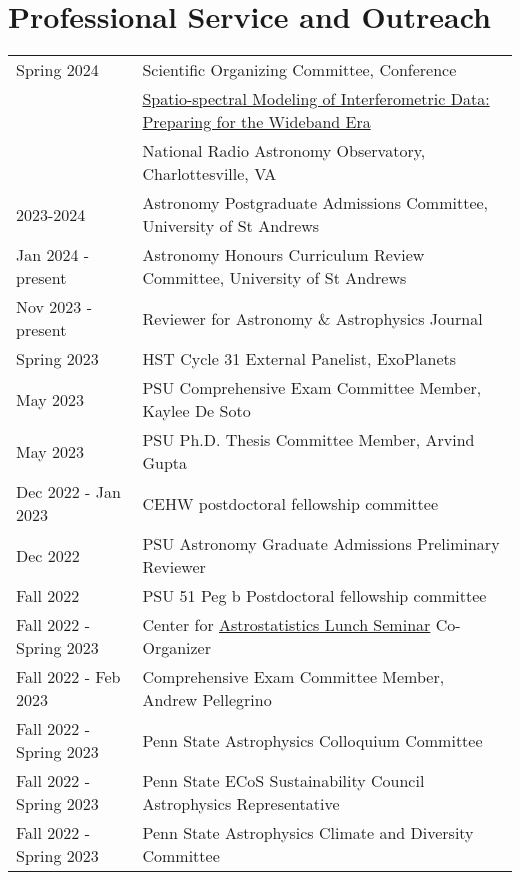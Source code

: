 \section*{Professional Service and Outreach}
\begin{tabular*}{\textwidth}{@{\hspace{10pt}}p{1.4in}l}
Spring 2024 & Scientific Organizing Committee, Conference\\
& \href{https://science.nrao.edu/facilities/alma/naasc-workshops/ssmid/index}{Spatio-spectral Modeling of Interferometric Data: Preparing for the Wideband Era} \\
& National Radio Astronomy Observatory, Charlottesville, VA \\
2023-2024 & Astronomy Postgraduate Admissions Committee, University of St Andrews \\
Jan 2024 - present & Astronomy Honours Curriculum Review Committee, University of St Andrews \\
Nov 2023 - present & Reviewer for Astronomy \& Astrophysics Journal \\
Spring 2023 & HST Cycle 31 External Panelist, ExoPlanets \\
May 2023 & PSU Comprehensive Exam Committee Member, Kaylee De Soto \\    
May 2023 & PSU Ph.D. Thesis Committee Member, Arvind Gupta\\
Dec 2022 - Jan 2023 & CEHW postdoctoral fellowship committee \\
Dec 2022 & PSU Astronomy Graduate Admissions Preliminary Reviewer \\
Fall 2022 & PSU 51 Peg b Postdoctoral fellowship committee \\
Fall 2022 - Spring 2023 & Center for \href{https://sites.psu.edu/astrostatistics/cast-lunch-meetings/}{Astrostatistics Lunch Seminar} Co-Organizer \\
Fall 2022 - Feb 2023 & Comprehensive Exam Committee Member, Andrew Pellegrino \\    
Fall 2022 - Spring 2023 & Penn State Astrophysics Colloquium Committee \\
Fall 2022 - Spring 2023 & Penn State ECoS Sustainability Council Astrophysics Representative \\
Fall 2022 - Spring 2023 & Penn State Astrophysics Climate and Diversity Committee \\

\end{tabular*}
